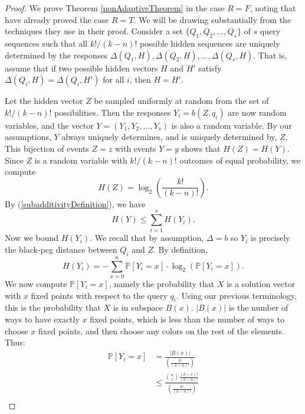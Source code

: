 \documentclass[12pt, a4paper]{article}
\begin{document}
\begin{proof}
	We prove Theorem \ref{nonAdaptiveTheorem} in the case $R = F$, noting that \cite{DS13} have already proved the case $R=T$. We will be drawing substantially from the techniques they use in their proof. Consider a set $\{Q_1, Q_2, \ldots, Q_s\}$ of $s$ query sequences such that all $k!/(k-n)!$ possible hidden sequences are uniquely determined by the responses $\Delta(Q_1, H), \Delta(Q_2, H), \ldots, \Delta(Q_s, H)$. That is, assume that if two possible hidden vectors $H$ and $H'$ satisfy $\Delta(Q_i, H) = \Delta(Q_i, H')$ for all $i$, then $H = H'$.

	Let the hidden vector $Z$ be sampled uniformly at random from the set of $k!/(k-n)!$ possibilities. Then the responses $Y_i = b(Z, q_i)$ are now random variables, and the vector $Y = (Y_1, Y_2, \ldots, Y_s)$ is also a random variable. By our assumptions, $Y$ always uniquely determines, and is uniquely determined by, $Z$. This bijection of events  $Z=z$ with events $Y=y$ shows that $H(Z) = H(Y)$. Since $Z$ is a random variable with $k!/(k-n)!$ outcomes of equal probability, we compute
	\begin{equation}\label{equalEntropy}
		H(Z) = \log_2\left(\frac{k!}{(k-n)!}\right).
	\end{equation}
	By (\ref{subadditivityDefinition}), we have
	\begin{equation}\label{entropySum}
		H(Y)\le\sum_{i=1}^s H(Y_i).
	\end{equation}
	Now we bound $H(Y_i)$. We recall that by assumption, $\Delta = b$ so $Y_i$ is precisely the black-peg distance between $Q_i$ and $Z$. By definition,
	\begin{equation}\label{entropyDef}
		H(Y_i)=-\sum_{x=0}^n \mathbb{P}[Y_i=x]\cdot\log_2(\mathbb{P}[Y_{i}=x]).
	\end{equation}
	We now compute $\mathbb{P}[Y_i=x]$, namely the probability that $X$ is a solution vector with $x$ fixed points with respect to the query $q_i$. Using our previous terminology, this is the probability that $X$ is in subspace $B(x)$.
	$|B(x)|$ is the number of ways to have exactly $x$ fixed points, which is less than the number of ways to choose $x$ fixed points, and then choose any colors on the rest of the elements. Thus:
	\begin{align*}
		\mathbb{P}[Y_i = x] &= \frac{|B(x)|}{\left(\frac{k!}{(k-n)!}\right)}\\
		&\leq \frac{\binom{n}{x}\frac{(k-x)!}{(k-n)!}}{\left(\frac{k!}{(k-n)!}\right)}\\

\end{align*}
\end{proof}
\end{document}
